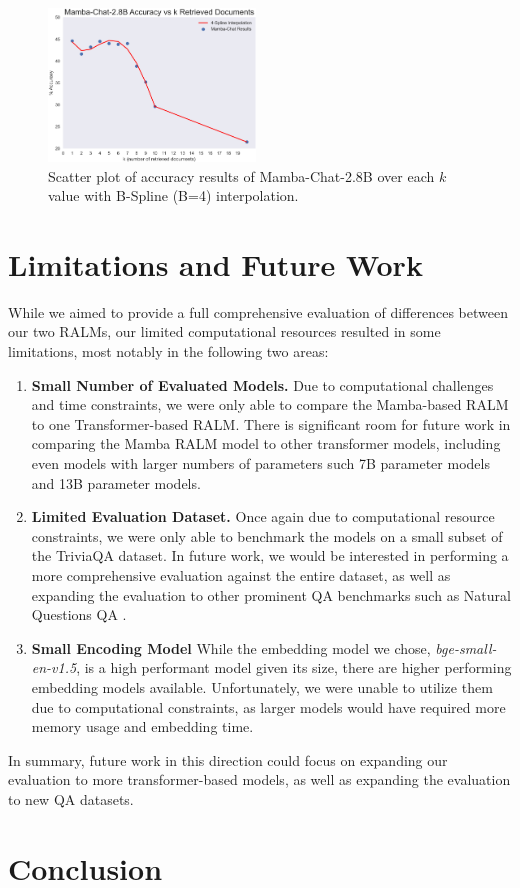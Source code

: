\documentclass[11pt]{article}
\begin{document}
\begin{figure}[!htbp]
    \centering
    \includegraphics[width=0.49\textwidth]{overleaf/figs/mamba-chat-results-over-k.png}
    \caption{Scatter plot of accuracy results of Mamba-Chat-2.8B over each $k$ value with B-Spline (B=4) interpolation.}
    \label{fig:mamba-chat-results}
\end{figure}

\section{Limitations and Future Work}
While we aimed to provide a full comprehensive evaluation of differences between our two RALMs, our limited computational resources resulted in some limitations, most notably in the following two areas:
\begin{enumerate}
    \item \textbf{Small Number of Evaluated Models.} Due to computational challenges and time constraints, we were only able to compare the Mamba-based RALM to one Transformer-based RALM. There is significant room for future work in comparing the Mamba RALM model to other transformer models, including even models with larger numbers of parameters such 7B parameter models and 13B parameter models.
    \item \textbf{Limited Evaluation Dataset.} Once again due to computational resource constraints, we were only able to benchmark the models on a small subset of the TriviaQA dataset. In future work, we would be interested in performing a more comprehensive evaluation against the entire dataset, as well as expanding the evaluation to other prominent QA benchmarks such as Natural Questions QA \cite{kwiatkowski-etal-2019-natural}.
    \item \textbf{Small Encoding Model} While the embedding model we chose, \textit{bge-small-en-v1.5}, is a high performant model given its size, there are higher performing embedding models available. Unfortunately, we were unable to utilize them due to computational constraints, as larger models would have required more memory usage and embedding time.
\end{enumerate}
In summary, future work in this direction could focus on expanding our evaluation to more transformer-based models, as well as expanding the evaluation to new QA datasets.
\section{Conclusion}







\end{document}

